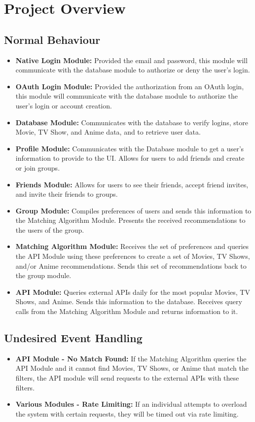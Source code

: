 \documentclass[12pt, titlepage]{article}
\begin{document}
\section{Project Overview}

\subsection{Normal Behaviour}
\begin{itemize}
	\item \textbf{Native Login Module:} Provided the email and password, this module will communicate with the database module to authorize or deny the user's login.
	\item \textbf{OAuth Login Module:} Provided the authorization from an OAuth login, this module will communicate with the database module to authorize the user's login or account creation.
	\item \textbf{Database Module:} Communicates with the database to verify logins, store Movie, TV Show, and Anime data, and to retrieve user data.
	\item \textbf{Profile Module:} Communicates with the Database module to get a user's information to provide to the UI. Allows for users to add friends and create or join groups. 
	\item \textbf{Friends Module:} Allows for users to see their friends, accept friend invites, and invite their friends to groups. 
	\item \textbf{Group Module:} Compiles preferences of users and sends this information to the Matching Algorithm Module. Presents the received recommendations to the users of the group. 
	\item \textbf{Matching Algorithm Module:} Receives the set of preferences and queries the API Module using these preferences to create a set of Movies, TV Shows, and/or Anime recommendations. Sends this set of recommendations back to the group module. 
	\item \textbf{API Module:} Queries external APIs daily for the most popular Movies, TV Shows, and Anime. Sends this information to the database. Receives query calls from the Matching Algorithm Module and returns information to it. 
\end{itemize}

\subsection{Undesired Event Handling}
\begin{itemize}
	\item \textbf{API Module - No Match Found:} If the Matching Algorithm queries the API Module and it cannot find Movies, TV Shows, or Anime that match the filters, the API module will send requests to the external APIs with these filters. 
	\item \textbf{Various Modules - Rate Limiting:} If an individual attempts to overload the system with certain requests, they will be timed out via rate limiting.
\end{itemize}
\end{document}
